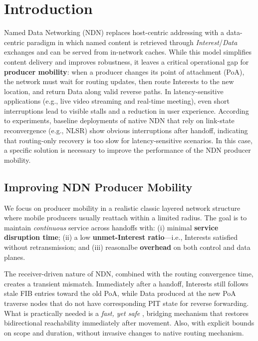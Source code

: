 \chapter{Introduction}
\label{c:introduction}

Named Data Networking (NDN) replaces host-centric addressing with a data-centric paradigm in which named content is retrieved through \emph{Interest}/\emph{Data} exchanges and can be served from in-network caches. While this model simplifies content delivery and improves robustness, it leaves a critical operational gap for \textbf{producer mobility}: when a producer changes its point of attachment (PoA), the network must wait for routing updates, then route Interests to the new location, and return Data along valid reverse paths. In latency-sensitive applications (e.g., live video streaming and real-time meeting), even short interruptions lead to visible stalls and a reduction in user experience. According to experiments, baseline deployments of native NDN that rely on link-state reconvergence (e.g., NLSR) show obvious interruptions after handoff, indicating that routing-only recovery is too slow for latency-sensitive scenarios. In this case, a specific solution is necessary to improve the performance of the NDN producer mobility.


\section{Improving NDN Producer Mobility}
\label{sec:introduction:improving_ndn_producer_mobility}

We focus on producer mobility in a realistic classic layered network structure where mobile producers usually reattach within a limited radius. The goal is to maintain \emph{continuous} service across handoffs with: (i) minimal \textbf{service disruption time}; (ii) a low \textbf{unmet-Interest ratio}—i.e., Interests satisfied without retransmission; and (iii) reasonalbe \textbf{overhead} on both control and data planes.

The receiver-driven nature of NDN, combined with the routing convergence time, creates a transient mismatch. Immediately after a handoff, Interests still follows stale FIB entries toward the old PoA, while Data produced at the new PoA traverse nodes that do not have corresponding PIT state for reverse forwarding. What is practically needed is a \emph{fast, yet safe} , bridging mechanism that restores bidirectional reachability immediately after movement. Also, with explicit bounds on scope and duration, without invasive changes to native routing mechanism.

